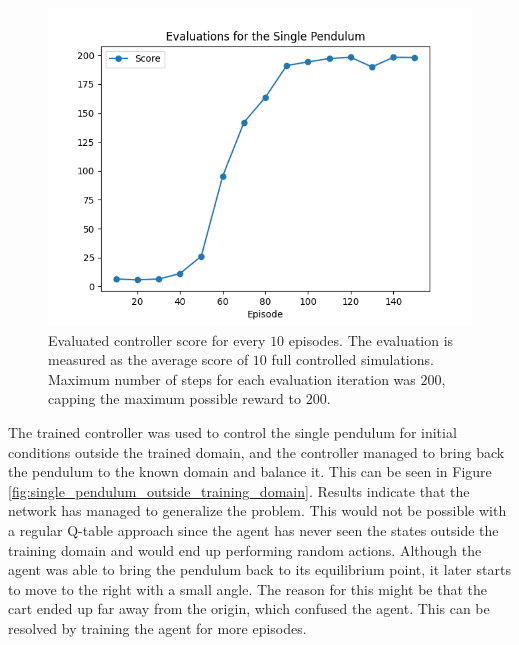 \documentclass{LTHtwocol} %
\begin{document}
\begin{figure}[H]
	\centering
	\includegraphics[width=0.9\columnwidth]{figures/SinglePendulum_eval.png}
	\caption{Evaluated controller score for every $10$ episodes. The evaluation is measured as the average score of $10$ full controlled simulations. Maximum number of steps for each evaluation iteration was $200$, capping the maximum possible reward to $200$.}
	\label{fig:single_pendulum_eval}
\end{figure}

%

The trained controller was used to control the single pendulum for initial conditions outside the trained domain, and the controller managed to bring back the pendulum to the known domain and balance it.
This can be seen in Figure \ref{fig:single_pendulum_outside_training_domain}.
Results indicate that the network has managed to generalize the problem.
This would not be possible with a regular Q-table approach since the agent has never seen the states outside the training domain and would end up performing random actions.
Although the agent was able to bring the pendulum back to its equilibrium point, it later starts to move to the right with a small angle.
The reason for this might be that the cart ended up far away from the origin, which confused the agent.
This can be resolved by training the agent for more episodes.
\end{document}
